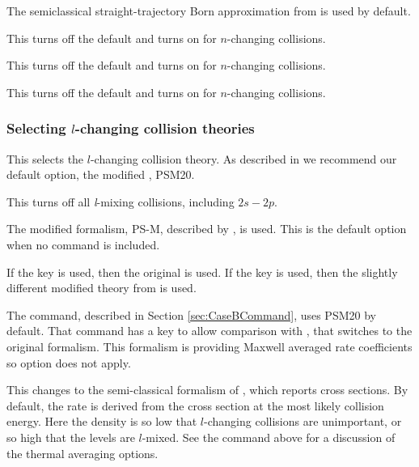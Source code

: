  The semiclassical 
straight-trajectory Born approximation from \citet{Lebedevandbeigman1998} is 
used by default. 

 This turns off the default
\citet{Lebedevandbeigman1998} and turns on \cite{Vriens1980} for $n$-changing
collisions.

 This turns off the default
\citet{Lebedevandbeigman1998} and turns on \cite{Fujimoto1978} for $n$-changing
collisions.

 This turns off the default 
\citet{Lebedevandbeigman1998} and turns on \cite{VanRegemorter1962} for $n$-changing 
collisions. 

\subsubsection{Selecting $l$-changing collision theories}

This selects the $l$-changing collision theory.  
As described in \cite{Badnell2021} we recommend our default option,
the modified  \citet{PengellySeaton1964}, PSM20.

This turns off all \emph{l}-mixing collisions, including  $2s-2p$.

The  modified \citet{PengellySeaton1964} formalism, PS-M, described by 
\citep{Badnell2021}, is used. This is the default option when no command is included.

If the key  is used, then the original \citet{PengellySeaton1964} is used.
If the key  is used, then the slightly different modified theory from \citep{Guzman.II.2017}
is used.

The  command, described in Section \ref{sec:CaseBCommand},
uses PSM20 by default.
That command has a key  to allow comparison with \citet{Hummer1987}, 
that switches to the original \citet{PengellySeaton1964} formalism. This formalism is providing Maxwell averaged rate coefficients so  option does not apply.


  This
changes to the semi-classical formalism  of \citet{Vrinceanu2001}, which reports cross sections.
By default, the rate is derived from the cross section at the most likely collision energy.
Here the density is so low that $l$-changing collisions are unimportant, or so high that the
levels are $l$-mixed. See the  
command above for a discussion of the thermal averaging options.


